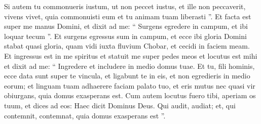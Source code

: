 \begin{biblechapter}
\begin{biblechapter}
\begin{biblechapter}
\verse Si autem tu commonueris iustum, ut non peccet iustus, et ille non peccaverit, vivens vivet, quia commonuisti eum et tu animam tuam liberasti ”.
 \verse Et facta est super me manus Domini, et dixit ad me: “ Surgens egredere in campum, et ibi loquar tecum ”. 
\verse Et surgens egressus sum in campum, et ecce ibi gloria Domini stabat quasi gloria, quam vidi iuxta fluvium Chobar, et cecidi in faciem meam. 
\verse Et ingressus est in me spiritus et statuit me super pedes meos et locutus est mihi et dixit ad me: “ Ingredere et includere in medio domus tuae. 
\verse Et tu, fili hominis, ecce data sunt super te vincula, et ligabunt te in eis, et non egredieris in medio eorum; 
\verse et linguam tuam adhaerere faciam palato tuo, et eris mutus nec quasi vir obiurgans, quia domus exasperans est. 
\verse Cum autem locutus fuero tibi, aperiam os tuum, et dices ad eos: Haec dicit Dominus Deus. Qui audit, audiat; et, qui contemnit, contemnat, quia domus exasperans est ”.
 

\end{biblechapter}
\end{biblechapter}
\end{biblechapter}
